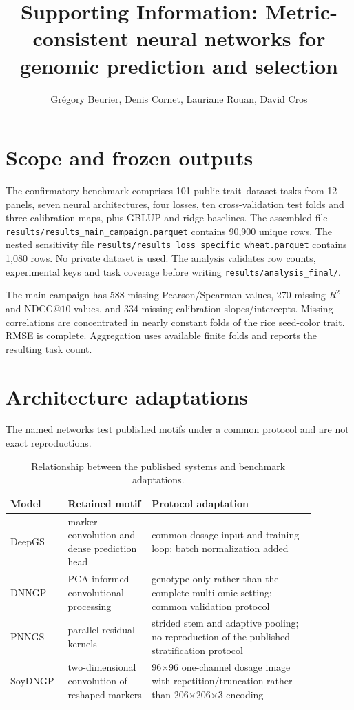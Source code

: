 \documentclass[10pt]{article}
\title{Supporting Information: Metric-consistent neural networks for genomic prediction and selection}
\author{Gr\'egory Beurier, Denis Cornet, Lauriane Rouan, David Cros}
\date{}
\begin{document}
\maketitle

\section{Scope and frozen outputs}
The confirmatory benchmark comprises 101 public trait--dataset tasks from 12
panels, seven neural architectures, four losses, ten cross-validation test folds
and three calibration maps, plus GBLUP and ridge baselines. The assembled file
\texttt{results/results\_main\_campaign.parquet} contains 90,900 unique rows.
The nested sensitivity file
\texttt{results/results\_loss\_specific\_wheat.parquet} contains 1,080 rows.
No private dataset is used. The analysis validates row counts, experimental keys
and task coverage before writing \texttt{results/analysis\_final/}.

The main campaign has 588 missing Pearson/Spearman values, 270 missing $R^2$ and
NDCG@$10$ values, and 334 missing calibration slopes/intercepts. Missing
correlations are concentrated in nearly constant folds of the rice seed-color
trait. RMSE is complete. Aggregation uses available finite folds and reports the
resulting task count.

\section{Architecture adaptations}
The named networks test published motifs under a common protocol and are not
exact reproductions.

\begin{table}[h]
\centering\small
\caption{Relationship between the published systems and benchmark adaptations.}
\begin{tabular}{p{0.14\linewidth}p{0.25\linewidth}p{0.49\linewidth}}
\toprule
Model & Retained motif & Protocol adaptation \\
\midrule
DeepGS \citep{ma2018deepgs} & marker convolution and dense prediction head & common dosage input and training loop; batch normalization added \\
DNNGP \citep{wang2023dnngp} & PCA-informed convolutional processing & genotype-only rather than the complete multi-omic setting; common validation protocol \\
PNNGS \citep{pnngs2024} & parallel residual kernels & strided stem and adaptive pooling; no reproduction of the published stratification protocol \\
SoyDNGP \citep{gao2023soydngp} & two-dimensional convolution of reshaped markers & 96$\times$96 one-channel dosage image with repetition/truncation rather than 206$\times$206$\times$3 encoding \\
\bottomrule
\end{tabular}
\end{table}
\end{document}
